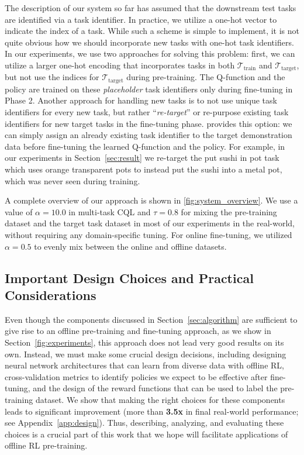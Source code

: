  The description of our system so far has assumed that the downstream test tasks are identified via a task identifier. In practice, we utilize a one-hot vector to indicate the index of a task. While such a scheme is simple to implement, it is not quite obvious how we should incorporate new tasks with one-hot task identifiers. In our experiments, we use two approaches for solving this problem: first, we can utilize a larger one-hot encoding that incorporates tasks in both $\mathcal{T}_\text{train}$ and $\mathcal{T}_\text{target}$, but not use the indices for $\mathcal{T}_\text{target}$ during pre-training. The Q-function and the policy are trained on these \emph{placeholder} task identifiers only during fine-tuning in Phase 2. 
Another approach for handling new tasks is to not use unique task identifiers for every new task, but rather ``\emph{re-target}'' or re-purpose existing task identifiers for new target tasks in the fine-tuning phase. \ptrmethodname provides this option: we can simply assign an already existing task identifier to the target demonstration data before fine-tuning the learned Q-function and the policy. For example, in our experiments in Section~\ref{sec:result} we re-target the put sushi in pot task which uses orange transparent pots to instead put the sushi into a metal pot, which was never seen during training.

A complete overview of our approach is shown in \autoref{fig:system_overview}. We use a value of $\alpha=10.0$ in multi-task CQL and $\tau=0.8$ for mixing the pre-training dataset and the target task dataset in most of our experiments in the real-world, without requiring any domain-specific tuning. For online fine-tuning, we utilized $\alpha=0.5$ to evenly mix between the online and offline datasets. 

\subsection{Important Design Choices and Practical Considerations}
\label{sec:design_choices}
Even though the components discussed in Section~\ref{sec:algorithm} are sufficient to give rise to an offline pre-training and fine-tuning approach, as we show in Section~\ref{fig:experiments}, this approach does not lead very good results on its own. Instead, we must make some crucial design decisions, including designing  neural network architectures that can learn from diverse data with offline RL,
cross-validation metrics to identify policies we expect to be effective after fine-tuning, and the design of the reward functions that can be used to label the pre-training dataset. {We show that making the right choices for these components leads to significant improvement (more than \textbf{3.5x} in final real-world performance; see Appendix~\ref{app:design}). Thus, describing, analyzing, and evaluating these choices is a crucial part of this work that we hope will facilitate applications of offline RL pre-training.}


